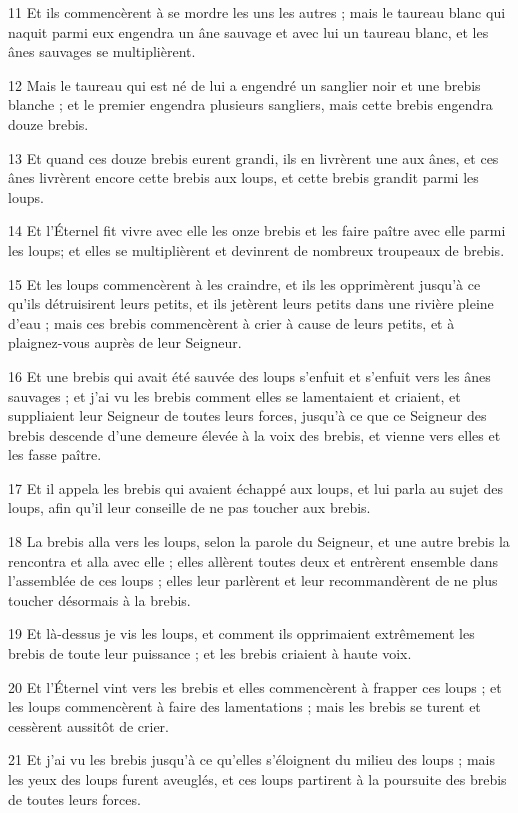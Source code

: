 \par 11 Et ils commencèrent à se mordre les uns les autres ; mais le taureau blanc qui naquit parmi eux engendra un âne sauvage et avec lui un taureau blanc, et les ânes sauvages se multiplièrent.
\par 12 Mais le taureau qui est né de lui a engendré un sanglier noir et une brebis blanche ; et le premier engendra plusieurs sangliers, mais cette brebis engendra douze brebis.
\par 13 Et quand ces douze brebis eurent grandi, ils en livrèrent une aux ânes, et ces ânes livrèrent encore cette brebis aux loups, et cette brebis grandit parmi les loups.
\par 14 Et l'Éternel fit vivre avec elle les onze brebis et les faire paître avec elle parmi les loups; et elles se multiplièrent et devinrent de nombreux troupeaux de brebis.
\par 15 Et les loups commencèrent à les craindre, et ils les opprimèrent jusqu'à ce qu'ils détruisirent leurs petits, et ils jetèrent leurs petits dans une rivière pleine d'eau ; mais ces brebis commencèrent à crier à cause de leurs petits, et à plaignez-vous auprès de leur Seigneur.
\par 16 Et une brebis qui avait été sauvée des loups s'enfuit et s'enfuit vers les ânes sauvages ; et j'ai vu les brebis comment elles se lamentaient et criaient, et suppliaient leur Seigneur de toutes leurs forces, jusqu'à ce que ce Seigneur des brebis descende d'une demeure élevée à la voix des brebis, et vienne vers elles et les fasse paître.
\par 17 Et il appela les brebis qui avaient échappé aux loups, et lui parla au sujet des loups, afin qu'il leur conseille de ne pas toucher aux brebis.
\par 18 La brebis alla vers les loups, selon la parole du Seigneur, et une autre brebis la rencontra et alla avec elle ; elles allèrent toutes deux et entrèrent ensemble dans l'assemblée de ces loups ; elles leur parlèrent et leur recommandèrent de ne plus toucher désormais à la brebis.
\par 19 Et là-dessus je vis les loups, et comment ils opprimaient extrêmement les brebis de toute leur puissance ; et les brebis criaient à haute voix.
\par 20 Et l'Éternel vint vers les brebis et elles commencèrent à frapper ces loups ; et les loups commencèrent à faire des lamentations ; mais les brebis se turent et cessèrent aussitôt de crier.
\par 21 Et j'ai vu les brebis jusqu'à ce qu'elles s'éloignent du milieu des loups ; mais les yeux des loups furent aveuglés, et ces loups partirent à la poursuite des brebis de toutes leurs forces.
